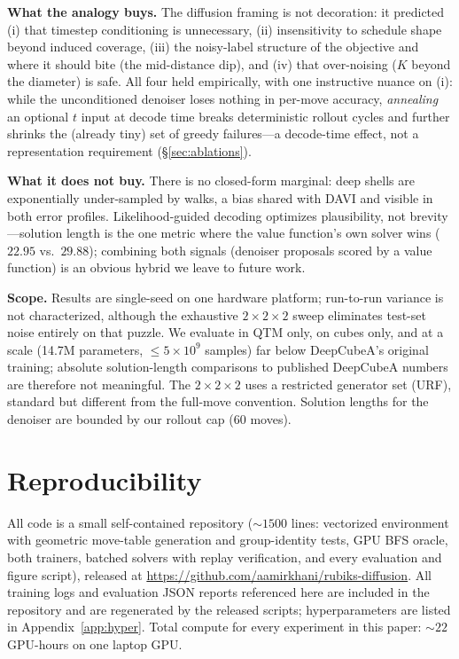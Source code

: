 \documentclass[11pt]{article}
\begin{document}
\textbf{What the analogy buys.} The diffusion framing is not decoration: it
predicted (i) that timestep conditioning is unnecessary, (ii) insensitivity
to schedule shape beyond induced coverage, (iii) the noisy-label structure of
the objective and where it should bite (the mid-distance dip), and (iv) that
over-noising ($K$ beyond the diameter) is safe. All four held empirically,
with one instructive nuance on (i): while the unconditioned denoiser loses
nothing in per-move accuracy, \emph{annealing} an optional $t$ input at decode
time breaks deterministic rollout cycles and further shrinks the (already
tiny) set of greedy failures---a decode-time effect, not a representation
requirement (\S\ref{sec:ablations}).

\textbf{What it does not buy.} There is no closed-form marginal: deep shells
are exponentially under-sampled by walks, a bias shared with DAVI and visible
in both error profiles. Likelihood-guided decoding optimizes plausibility, not
brevity---solution length is the one metric where the value function's own
solver wins ($22.95$ vs.\ $29.88$); combining both signals (denoiser proposals
scored by a value function) is an obvious hybrid we leave to future work.

\textbf{Scope.} Results are single-seed on one hardware platform; run-to-run
variance is not characterized, although the exhaustive $2{\times}2{\times}2$
sweep eliminates test-set noise entirely on that puzzle. We evaluate in QTM
only, on cubes only, and at a scale (14.7M parameters, $\le5\times10^9$
samples) far below DeepCubeA's original training; absolute solution-length
comparisons to published DeepCubeA numbers are therefore not meaningful. The
$2{\times}2{\times}2$ uses a restricted generator set (URF), standard but
different from the full-move convention. Solution lengths for the denoiser are
bounded by our rollout cap (60 moves).

\section{Reproducibility}

All code is a small self-contained repository (${\sim}1500$ lines: vectorized
environment with geometric move-table generation and group-identity tests, GPU
BFS oracle, both trainers, batched solvers with replay verification, and every
evaluation and figure script), released at
\url{https://github.com/aamirkhani/rubiks-diffusion}. All training logs and
evaluation JSON reports referenced here are included in the repository and are
regenerated by the released scripts; hyperparameters are listed in
Appendix~\ref{app:hyper}. Total compute for every experiment in this paper:
${\sim}22$ GPU-hours on one laptop GPU.
\end{document}
